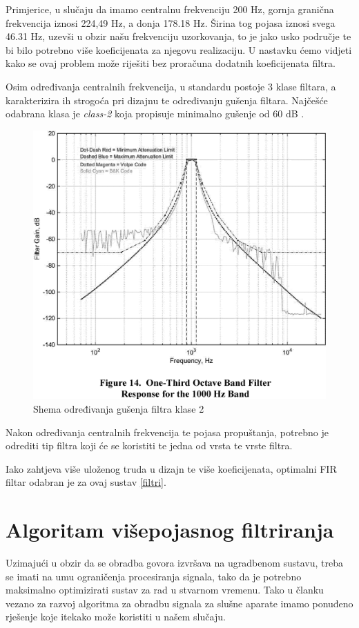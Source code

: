 \documentclass[times, utf8, diplomski]{fer}
\begin{document}
Primjerice, u slučaju da imamo centralnu frekvenciju 200 Hz, gornja granična frekvencija iznosi 224,49 Hz, a donja 178.18 Hz. Širina tog pojasa iznosi svega 46.31 Hz, uzevši u obzir našu frekvenciju uzorkovanja, to je jako usko područje te bi bilo potrebno više koeficijenata za njegovu realizaciju. U nastavku ćemo vidjeti kako se ovaj problem može riješiti bez proračuna dodatnih koeficijenata filtra.

Osim određivanja centralnih frekvencija, u standardu postoje 3 klase filtara, a karakterizira ih strogoća pri dizajnu te određivanju gušenja filtara. Najčešće odabrana klasa je \textit{class-2} koja propisuje minimalno gušenje od 60 dB \citep{ansi2004}.

\begin{figure}[hbt!]
\label{gui}
 \centering
 \includegraphics[scale=0.1]{photos/klasa2.png}
 \caption{Shema određivanja gušenja filtra klase 2}
\end{figure}

Nakon određivanja centralnih frekvencija te pojasa propuštanja, potrebno je odrediti tip filtra koji će se koristiti te jedna od vrsta te vrste filtra.

Iako zahtjeva više uloženog truda u dizajn te više koeficijenata, optimalni FIR filtar odabran je za ovaj sustav \ref{filtri}.

\chapter{Algoritam višepojasnog filtriranja}
Uzimajući u obzir da se obradba govora izvršava na ugradbenom sustavu, treba se imati na umu ograničenja procesiranja signala, tako da je potrebno maksimalno optimizirati sustav za rad u stvarnom vremenu. Tako u članku vezano za razvoj algoritma za obradbu signala za slušne aparate imamo ponuđeno rješenje koje itekako može koristiti u našem slučaju.
\end{document}
